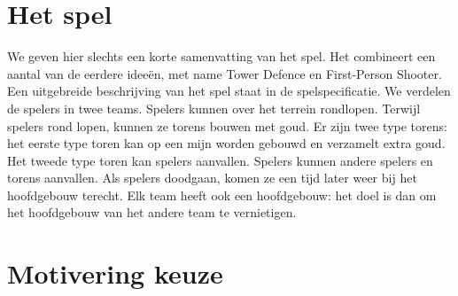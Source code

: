 \section{Het spel}
We geven hier slechts een korte samenvatting van het spel. Het combineert een aantal van de eerdere idee\"en, met name Tower Defence en First-Person Shooter. Een uitgebreide beschrijving van het spel staat in de spelspecificatie. We verdelen de spelers in twee teams. Spelers kunnen over het terrein rondlopen. Terwijl spelers rond lopen, kunnen ze torens bouwen met goud. Er zijn twee type torens: het eerste type toren kan op een mijn worden gebouwd en verzamelt extra goud. Het tweede type toren kan spelers aanvallen. Spelers kunnen andere spelers en torens aanvallen. Als spelers doodgaan, komen ze een tijd later weer bij het hoofdgebouw terecht. Elk team heeft ook een hoofdgebouw: het doel is dan om het hoofdgebouw van het andere team te vernietigen.

\section{Motivering keuze}